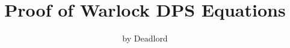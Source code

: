 \documentclass[12pt]{article}
\begin{document}
\title{Proof of Warlock DPS Equations}
\author{by Deadlord}
\date{}

\maketitle



\newpage
\end{document}
